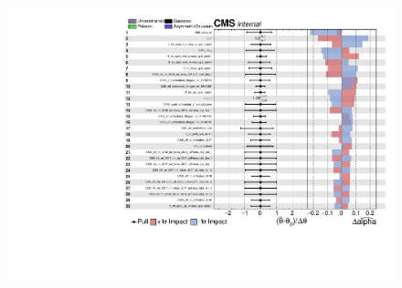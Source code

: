 \begin{figure}[!ht]
        \centering
        \includegraphics[scale=0.7]{Chapitre7/Images/impactspvblind.pdf} 
        \vspace{0.5ex}
    \caption{}
    \label{expectednuisance}
\end{figure}

